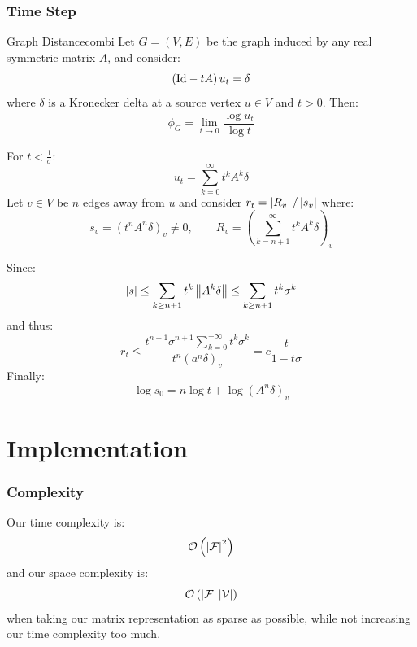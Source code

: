 \documentclass{beamercours}
\def\mF{\mathcal{F}}
\def\mV{\mathcal{V}}
\begin{document}
\begin{frame}[allowframebreaks]
	\frametitle{Time Step}
	\begin{théorème}{Graph Distance}{combi}
	Let $G = \left( V, E \right)$ be the graph induced by any real symmetric matrix $A$, and consider:
	\begin{equation*}
		\left( \mathrm{Id} - t A \right)u_{t} = \delta
	\end{equation*}
	where $\delta$ is a Kronecker delta at a source vertex $u \in V$ and $t > 0$. Then:
	\begin{equation*}
		\boxed{\phi_{G} = \lim_{t \to 0} \frac{\log u_{t}}{\log t}}
	\end{equation*}
	\end{théorème}
	\framebreak

	For $t < \frac{1}{\sigma}$:
	\begin{equation*}
		u_{t} = \sum_{k = 0}^{\infty} t^{k}A^{k}\delta
	\end{equation*}
	Let $v \in V$ be $n$ edges away from $u$ and consider $r_{t} = \left|R_{v}\right|/\left|s_{v}\right|$ where:
	\begin{equation*}
		s_{v} = \left( t^{n}A^{n}\delta \right)_{v} \neq 0, \qquad R_{v} = \left( \sum_{k = n + 1}^{\infty}t^{k}A^{k}\delta \right)_{v}
	\end{equation*}
	\framebreak

	Since:
	\begin{equation*}
		\left|s\right| \leq \sum_{k \geq n + 1} t^{k}\left\lVert A^{k}\delta \right\rVert \leq \sum_{k \geq n + 1}t^{k}\sigma^{k}
	\end{equation*}
	and thus:
	\begin{equation*}
		r_{t} \leq \frac{t^{n + 1}\sigma^{n + 1}\sum_{k = 0}^{+\infty}t^{k}\sigma^{k}}{t^{n}\left( a^{n}\delta \right)_{v}} = c\frac{t}{1 - t\sigma}
	\end{equation*}
	Finally:
	\begin{equation*}
		\log s_{0} = n\log t + \log \left( A^{n}\delta \right)_{v}
	\end{equation*}
\end{frame}

\section{Implementation}
\begin{frame}
	\frametitle{Complexity}
	Our time complexity is:
	\begin{equation*}
		\O\left( \abs{\mF}^{2} \right)
	\end{equation*}
	and our space complexity is:
	\begin{equation*}
		\O\left( \abs{\mF}\abs{\mV} \right)
	\end{equation*}
	when taking our matrix representation as sparse as possible, while not increasing our time complexity too much.
\end{frame}
\end{document}
